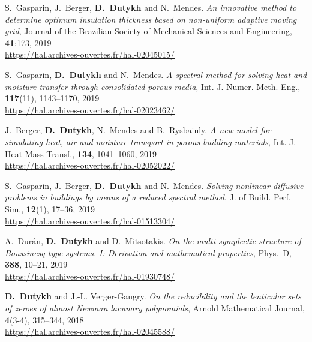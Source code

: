 \documentclass[final, a4paper, oneside, 12pt]{article}
\numberwithin{equation}{section}
\begin{document}
\begin{etaremune}
  \item S.~Gasparin, J.~Berger, \textbf{D.~Dutykh} and N.~Mendes. \textit{An innovative method to determine optimum insulation thickness based on non-uniform adaptive moving grid}, Journal of the Brazilian Society of Mechanical Sciences and Engineering, \textbf{41}:173, 2019 \\ %
  \url{https://hal.archives-ouvertes.fr/hal-02045015/}
  
  \item S.~Gasparin, \textbf{D.~Dutykh} and N.~Mendes. \textit{A spectral method for solving heat and moisture transfer through consolidated porous media}, Int. J. Numer. Meth. Eng., \textbf{117}(11), 1143--1170, 2019 \\ %
  \url{https://hal.archives-ouvertes.fr/hal-02023462/}
  
  \item J.~Berger, \textbf{D.~Dutykh}, N.~Mendes and B.~Rysbaiuly. \textit{A new model for simulating heat, air and moisture transport in porous building materials}, Int. J. Heat Mass Transf., \textbf{134}, 1041--1060, 2019 \\ %
  \url{https://hal.archives-ouvertes.fr/hal-02052022/}
  
  \item S.~Gasparin, J.~Berger, \textbf{D.~Dutykh} and N.~Mendes. \textit{Solving nonlinear diffusive problems in buildings by means of a reduced spectral method}, J. of Build. Perf. Sim., \textbf{12}(1), 17--36, 2019 \\ %
  \url{https://hal.archives-ouvertes.fr/hal-01513304/}
  
  \item A.~Dur\'an, \textbf{D.~Dutykh} and D.~Mitsotakis. \textit{On the multi-symplectic structure of Boussinesq-type systems. I: Derivation and mathematical properties}, Phys.~D, \textbf{388}, 10--21, 2019 \\ %
  \url{https://hal.archives-ouvertes.fr/hal-01930748/}

  
  \item \textbf{D.~Dutykh} and J.-L. Verger-Gaugry. \textit{On the reducibility and the lenticular sets of zeroes of almost Newman lacunary polynomials}, Arnold Mathematical Journal, \textbf{4}(3-4), 315--344, 2018 \\ %
  \url{https://hal.archives-ouvertes.fr/hal-02045588/}
  

\end{etaremune}
\end{document}
